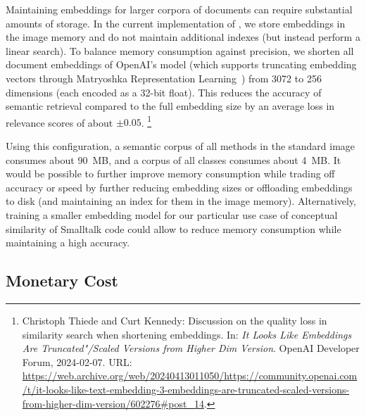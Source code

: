 Maintaining embeddings for larger corpora of documents can require substantial amounts of storage.
In the current implementation of \semtex, we store embeddings in the image memory and do not maintain additional indexes (but instead perform a linear search).
To balance memory consumption against precision, we shorten all document embeddings of OpenAI's  model (which supports truncating embedding vectors through Matryoshka Representation Learning~\cite{kusupati2024matryoshka}) from 3072 to 256 dimensions (each encoded as a 32-bit float).
This reduces the accuracy of semantic retrieval compared to the full embedding size by an average loss in relevance scores of about $\pm 0.05$.%
\footnote{Christoph Thiede and Curt Kennedy: Discussion on the quality loss in similarity search when shortening embeddings. In: \emph{It Looks Like  Embeddings Are Truncated"/Scaled Versions from Higher Dim Version}. OpenAI Developer Forum, 2024-02-07. URL: \url{https://web.archive.org/web/20240413011050/https://community.openai.com/t/it-looks-like-text-embedding-3-embeddings-are-truncated-scaled-versions-from-higher-dim-version/602276\#post_14}.}

Using this configuration, a semantic corpus of all methods in the standard image consumes about \qty{90}{MB}, and a corpus of all classes consumes about \qty{4}{MB}.
It would be possible to further improve memory consumption while trading off accuracy or speed by further reducing embedding sizes or offloading embeddings to disk (and maintaining an index for them in the image memory).
Alternatively, training a smaller embedding model for our particular use case of conceptual similarity of Smalltalk code could allow to reduce memory consumption while maintaining a high accuracy.

\subsection*{Monetary Cost}
\label{sec:discussion/performance/money}

